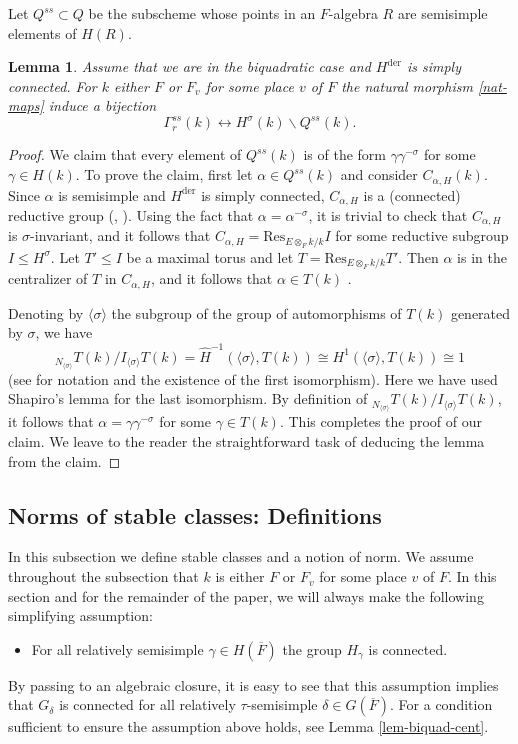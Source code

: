 \documentclass[12pt]{amsart}
\newtheorem{lem}[thm]{Lemma}
\theoremstyle{remark}
\numberwithin{equation}{section}
\theoremstyle{definition}
\renewcommand{\bar}{\overline}
\numberwithin{equation}{subsection}
\renewcommand{\hat}{\widehat}
\begin{document}
Let $Q^{ss} \subset Q$ be the subscheme whose points in
an $F$-algebra $R$ are semisimple elements of $H(R)$.

\begin{lem} \label{lem-sscl1} Assume that we are in the biquadratic case and $H^{\mathrm{der}}$ is simply connected.
For $k$ either $F$ or $F_v$ for some place $v$ of $F$ the natural morphism \eqref{nat-maps} induce
a bijection
$$
\Gamma_r^{ss}(k) \leftrightarrow H^{\sigma}(k) \backslash Q^{ss}(k).
$$
\end{lem}
\begin{proof}
We claim that every element of $Q^{ss}(k)$ is of the form $\gamma \gamma^{-\sigma}$
for some $\gamma
\in H(k)$.  To prove the claim, first let $\alpha \in Q^{ss}(k)$ and consider $C_{\alpha,H}(k)$.
Since $\alpha$ is semisimple and $H^{\mathrm{der}}$ is simply connected, $C_{\alpha,H}$ is a
(connected) reductive group (\cite{SteinbMem}, \cite[\S 3]{KottRatConj}). Using the fact that $\alpha=\alpha^{-\sigma}$,
it is trivial to check that $C_{\alpha,H}$ is $\sigma$-invariant, and it follows that
$C_{\alpha,H}=\mathrm{Res}_{E \otimes_F k/k}I$ for some reductive subgroup $I \leq H^{\sigma}$.  Let $T' \leq
I$ be a maximal torus and let $T=\mathrm{Res}_{E \otimes_F k/k}T'$.  Then $\alpha$ is in the
centralizer of $T$ in $C_{\alpha,H}$, and it follows that $\alpha \in T(k)$
\cite[\S IV.11.12]{LAGBorel}.

Denoting by $\langle \sigma \rangle$ the subgroup of the group of automorphisms
of $T(k)$ generated by $\sigma$, we have
$$
{}_{N_{\langle \sigma \rangle}}T(k)/I_{\langle \sigma \rangle}T(k)
=\hat{H}^{-1}(\langle \sigma \rangle,T(k)) \cong H^1(\langle \sigma \rangle, T(k))\cong1
$$
(see \cite[\S VIII.1 and \S VIII.4]{SerreLFs} for notation and the existence of the
first isomorphism).  Here we have used Shapiro's lemma for the last isomorphism.
By definition of ${}_{N_{\langle \sigma \rangle}}T(k)/I_{\langle \sigma \rangle}T(k)$,
it follows that $\alpha=\gamma \gamma^{-\sigma}$ for some $\gamma \in T(k)$.  This completes the proof
of our claim.  We leave to the reader the straightforward task of deducing the lemma from the claim.
\end{proof}

\subsection{Norms of stable classes: Definitions}
\label{ssec-match} In this subsection we define stable classes and a notion of norm.
We assume throughout the subsection that $k$ is either $F$ or $F_v$ for some place $v$ of $F$.
 In this section and for the remainder of the paper, we will always make the following simplifying assumption:
\begin{itemize}
\item For all relatively semisimple $\gamma \in H(\bar{F})$ the group $H_{\gamma}$ is connected.
\end{itemize}
By passing to an algebraic closure, it is easy to see that this assumption implies that $G_{\delta}$ is connected for all relatively $\tau$-semisimple $\delta \in G(\bar{F})$.  For a condition sufficient to ensure the assumption above holds, see Lemma \ref{lem-biquad-cent}.
\end{document}
